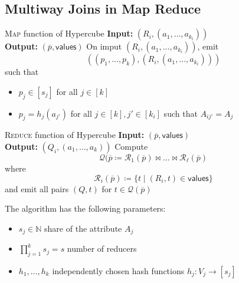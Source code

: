 \documentclass{panikzettel}
\begin{document}
\subsection{Multiway Joins in Map Reduce}
\begin{halfboxl}
\vspace{-\baselineskip}
\begin{algo}{\textsc{Map} function of Hypercube}
\textbf{Input:} $(R_i, (a_1, \ldots, a_{k_i}))$ \\
\textbf{Output:} $(\overline{p}, \textsf{values})$
\tcblower
On imput $(R_i, (a_1, \ldots, a_{k_i}))$, emit
\[
((p_1,...,p_k),(R_i,(a_1,...,a_{k_i})))
\]
such that
\begin{itemize}
	\item $p_j\in [s_j]$ for all $j\in [k]$
	\item $p_j=h_j(a_{j'})$ for all $j\in [k],j'\in [k_i]$ such that $A_{ij'}=A_j$
\end{itemize}
\end{algo}
\end{halfboxl}%
\begin{halfboxr}
\vspace{-\baselineskip}
\begin{algo}{\textsc{Reduce} function of Hypercube}
\textbf{Input:} $(\overline{p}, \textsf{values})$ \\
\textbf{Output:} $(Q_i, (a_1, \ldots, a_k))$
\tcblower
Compute
\[
\mathcal{Q}(\overline{p}\coloneqq \mathcal{R}_1(\overline{p})\bowtie \ldots \bowtie \mathcal{R}_\ell (\overline{p})
\]
where
\[
\mathcal{R}_i(\overline{p})\coloneqq \{t\mid (R_i, t)\in \textsf{values} \}
\]
and emit all pairs $(Q,t)$ for $t\in \mathcal{Q}(\overline{p})$
\end{algo}
\end{halfboxr}

The algorithm has the following parameters:

\begin{itemize}
	\item $s_j \in \mathbb{N}$ share of the attribute $A_j$
	\item $\prod_{j=1}^k s_j = s$ number of reducers
	\item $h_1, \ldots, h_k$ independently chosen hash functions $h_j : V_j \rightarrow [s_j]$
\end{itemize}
\end{document}
